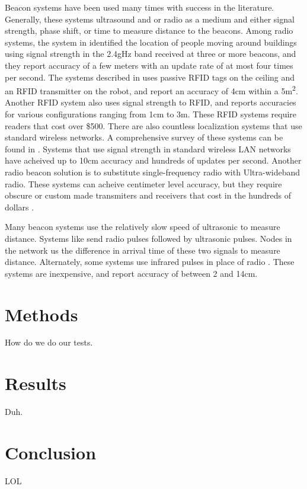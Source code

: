 \documentclass{article}
\begin{document}
Beacon systems have been used many times with success in the literature. Generally, these systems ultrasound and or radio as a medium and either signal strength, phase shift, or time to measure distance to the beacons. Among radio systems, the system in \cite{bahl_radar:_2000} identified the location of people moving around buildings using signal strength in the 2.4gHz band received at three or more beacons, and they report accuracy of a few meters with an update rate of at most four times per second. The systems described in \cite{digiampaolo_mobile_2014} uses passive RFID tags on the ceiling and an RFID transmitter on the robot, and report an accuracy of 4\si{\centi\meter} within a 5\si{\square\meter}. Another RFID system \cite{saab_standalone_2011} also uses signal strength to RFID, and reports accuracies for various configurations ranging from 1\si{\centi\meter} to 3\si{\meter}. These RFID systems require readers that cost over \$500. There are also countless localization systems that use standard wireless networks. A comprehensive survey of these systems can be found in \cite{liu_survey_2007}. Systems that use signal strength in standard wireless LAN networks have acheived up to 10\si{\centi\meter} accuracy and hundreds of updates per second. Another radio beacon solution is to substitute single-frequency radio with Ultra-wideband radio. These systems can acheive centimeter level accuracy, but they require obscure or custom made transmiters and receivers that cost in the hundreds of dollars \cite{noauthor_dart_nodate} \cite{noauthor_pozyx_nodate}.

Many beacon systems use the relatively slow speed of ultrasonic to measure distance. Systems like \cite{smith_tracking_2004} \cite{ward_new_1997} \cite{kim_advanced_2008} send radio pulses followed by ultrasonic pulses. Nodes in the network us the difference in arrival time of these two signals to measure distance. Alternately, some systems use infrared pulses in place of radio \cite{ghidary_new_1999} \cite{yucel_development_2012}. These systems are inexpensive, and report accuracy of between 2 and 14\si{\centi\meter}.

\section{Methods}

How do we do our tests.

\section{Results}

Duh.

\section{Conclusion}
LOL




\end{document}
